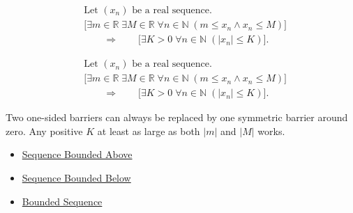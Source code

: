 \begin{remark*}
\[
\begin{aligned}
&\text{Let } (x_n) \text{ be a real sequence.}\\
&\bigl[
\exists m \in \mathbb{R}\;
\exists M \in \mathbb{R}\;
\forall n \in \mathbb{N}\;(m \le x_n \land x_n \le M)
\bigr]\\
&\qquad\Longrightarrow\qquad
\bigl[
\exists K > 0\;
\forall n \in \mathbb{N}\;(|x_n| \le K)
\bigr].
\end{aligned}
\]
\end{remark*}

\begin{remark*}
\[
\begin{aligned}
&\text{Let } (x_n) \text{ be a real sequence.}\\
&\bigl[
\exists m \in \mathbb{R}\;
\exists M \in \mathbb{R}\;
\forall n \in \mathbb{N}\;(m \le x_n \land x_n \le M)
\bigr]\\
&\qquad\Longrightarrow\qquad
\bigl[
\exists K > 0\;
\forall n \in \mathbb{N}\;(|x_n| \le K)
\bigr].
\end{aligned}
\]
\end{remark*}

\begin{remark*}[Interpretation]
Two one-sided barriers can always be replaced by one symmetric barrier around
zero. Any positive $K$ at least as large as both $|m|$ and $|M|$ works.
\end{remark*}

\begin{dependencies}
\begin{itemize}
  \item \hyperref[def:sequence-bounded-above]{Sequence Bounded Above}
  \item \hyperref[def:sequence-bounded-below]{Sequence Bounded Below}
  \item \hyperref[def:bounded-sequence]{Bounded Sequence}
\end{itemize}
\end{dependencies}
